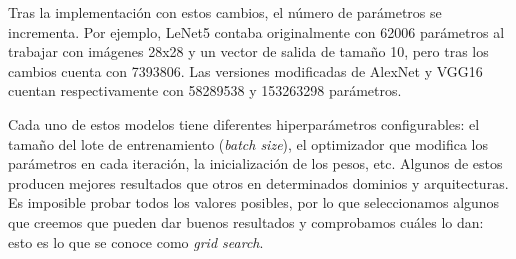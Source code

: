 Tras la implementación con estos cambios, el número de parámetros se incrementa. Por ejemplo, LeNet5 contaba originalmente con 62006 parámetros al trabajar con imágenes 28x28 y un vector de salida de tamaño 10, pero tras los cambios cuenta con 7393806. Las versiones modificadas de AlexNet y VGG16 cuentan respectivamente con 58289538 y 153263298 parámetros.

Cada uno de estos modelos tiene diferentes hiperparámetros configurables: el tamaño del lote de entrenamiento (\textit{batch size}), el optimizador que modifica los parámetros en cada iteración, la inicialización de los pesos, etc. Algunos de estos producen mejores resultados que otros en determinados dominios y arquitecturas. Es imposible probar todos los valores posibles, por lo que seleccionamos algunos que creemos que pueden dar buenos resultados y comprobamos cuáles lo dan: esto es lo que se conoce como \textit{grid search}.

